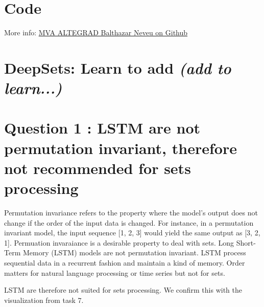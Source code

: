 \documentclass[a4paper]{article}
\begin{document}

\section*{Code}

More info:
\href{https://github.com/balthazarneveu/MVA23_ALTEGRAD/#readme}{MVA ALTEGRAD Balthazar Neveu on Github}

\section*{DeepSets: Learn to add \textit{(add to learn...)}}
\section*{Question 1 : LSTM are not permutation invariant, therefore not recommended for sets processing}
Permutation invariance refers to the property where the model's output does not change if the order of the input data is changed. For instance, in a permutation invariant model, the input sequence [1, 2, 3] would yield the same output as [3, 2, 1]. Permuation invaraiance is a desirable property to deal with sets.
\newline
Long Short-Term Memory (LSTM) models are not permutation invariant. LSTM process sequential data in a recurrent fashion and maintain a kind of memory. Order matters for natural language processing or time series but not for sets.

LSTM are therefore not suited for sets processing.
We confirm this with the visualization from task 7.

% 
% 
\end{document}
